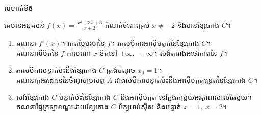 \documentclass[expologarit]{subfiles}
\begin{document}
\newpage 
\begin{center}
\color{violet} \kml លំហាត់ទី៥
\end{center}
 គេមានអនុគមន៍ $f(x)=\frac{x^2+3x+6}{x+2}$  កំណត់ចំពោះគ្រប់ $x\neq -2$ និងមានខ្សែកោង $C$។
\begin{enumerate}[m]
\item គណនា  $f'(x)$។ រកតម្លៃបរមានៃ $f$។ រកសមីការអាស៊ីមតូតនៃខ្សែកោង $C$។\\ គណនាលីមីតនៃ $f$  កាលណា $x$ ខិតទៅ $+\infty,\ -\infty$។ សង់តារាងអថេរភាពនៃ $f$។
\item រកសមីការបន្ទាត់ប៉ះនឹងខ្សែកោង $C$  ត្រង់ចំណុច $x_0=1$។\\ គណនាកូអរដោនេនៃចំណុចប្រសព្វ $A$ រវាងសមីការបន្ទាត់ប៉ះនឹងអាស៊ីមតូតទ្រេតនៃខ្សែកោង $C$។
\item សង់ខ្សែកោង $C$ បន្ទាត់ប៉ះនៃខ្សែកោង $C$ និងអាស៊ីមតូត នៅក្នុងតម្រុយអរតូណរម៉ាល់តែមួយ។\\ គណនាផ្ទៃក្រទ្បាខណ្ឌដោយខ្សែកោង $C$  អ័ក្សអាប់ស៊ីស និងបន្ទាត់ $x=1,\ x=2$។
\end{enumerate}
\end{document}

